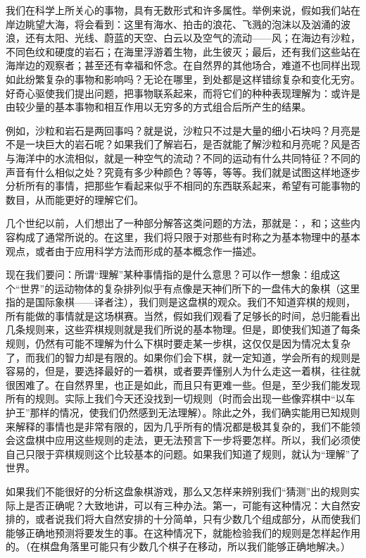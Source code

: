 \documentclass[11pt,oneside]{book}
\begin{document}
\begin{common-format}
我们在科学上所关心的事物，具有无数形式和许多属性。举例来说，假如我们站在岸边眺望大海，将会看到：这里有海水、拍击的浪花、飞溅的泡沫以及汹涌的波浪，还有太阳、光线、蔚蓝的天空、白云以及空气的流动——风；在海边有沙粒，不同色纹和硬度的岩石；在海里浮游着生物，此生彼灭；最后，还有我们这些站在海岸边的观察者；甚至还有幸福和怀念。在自然界的其他场合，难道不也同样出现如此纷繁复杂的事物和影响吗？无论在哪里，到处都是这样错综复杂和变化无穷。好奇心驱使我们提出问题，把事物联系起来，而将它们的种种表现理解为：或许是由较少量的基本事物和相互作用以无穷多的方式组合后所产生的结果。

例如，沙粒和岩石是两回事吗？就是说，沙粒只不过是大量的细小石块吗？月亮是不是一块巨大的岩石呢？如果我们了解岩石，是否就能了解沙粒和月亮呢？风是否与海洋中的水流相似，就是一种空气的流动？不同的运动有什么共同特征？不同的声音有什么相似之处？究竟有多少种颜色？等等，等等。我们就是试图这样地逐步分析所有的事情，把那些乍看起来似乎不相同的东西联系起来，希望有可能事物的数目，从而能更好的理解它们。

几个世纪以前，人们想出了一种部分解答这类问题的方法，那就是：，和；这些内容构成了通常所说的。在这里，我们将只限于对那些有时称之为基本物理中的基本观点，或者由于应用科学方法而形成的基本概念作一描述。

现在我们要问：所谓“理解”某种事情指的是什么意思？可以作一想象：组成这个“世界”的运动物体的复杂排列似乎有点像是天神们所下的一盘伟大的象棋（这里指的是国际象棋——译者注），我们则是这盘棋的观众。我们不知道弈棋的规则，所有能做的事情就是这场棋赛。当然，假如我们观看了足够长的时间，总归能看出几条规则来，这些弈棋规则就是我们所说的基本物理。但是，即使我们知道了每条规则，仍然有可能不理解为什么下棋时要走某一步棋，这仅仅是因为情况太复杂了，而我们的智力却是有限的。如果你们会下棋，就一定知道，学会所有的规则是容易的，但是，要选择最好的一着棋，或者要弄懂别人为什么走这一着棋，往往就很困难了。在自然界里，也正是如此，而且只有更难一些。但是，至少我们能发现所有的规则。实际上我们今天还没找到一切规则（时而会出现一些像弈棋中“以车护王”那样的情况，使我们仍然感到无法理解）。除此之外，我们确实能用已知规则来解释的事情也是非常有限的，因为几乎所有的情况都是极其复杂的，我们不能领会这盘棋中应用这些规则的走法，更无法预言下一步将要怎样。所以，我们必须使自己只限于弈棋规则这个比较基本的问题。如果我们知道了规则，就认为“理解”了世界。

如果我们不能很好的分析这盘象棋游戏，那么又怎样来辨别我们“猜测”出的规则实际上是否正确呢？大致地讲，可以有三种办法。第一，可能有这种情况：大自然安排的，或者说我们将大自然安排的十分简单，只有少数几个组成部分，从而使我们能够正确地预测将要发生的事。在这种情况下，就能检验我们的规则是怎样起作用的。（在棋盘角落里可能只有少数几个棋子在移动，所以我们能够正确地解决。）


\end{common-format}
\end{document}
